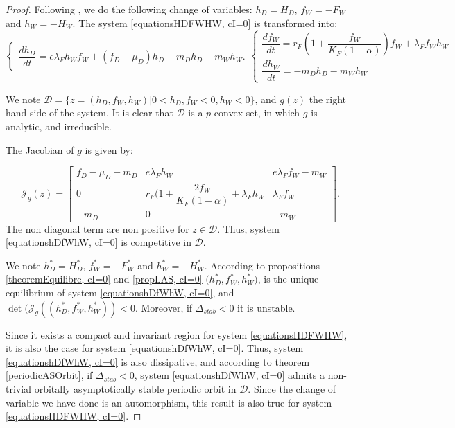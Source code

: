 \documentclass{article}
\newcommand{\lfw}{\lambda_{F}}
\newcommand{\lfw}{\lambda_{F}}
\begin{document}
\begin{proof}
Following \cite{wang_predator-prey_1997}, we do the following change of variables: $h_D =  H_D$, $f_W = -F_W$ and $h_W = -H_W$.  The system \eqref{equationsHDFWHW, cI=0} is transformed into:
\begin{subequations}
\begin{equation}
\left\{ \begin{array}{l}
\dfrac{dh_D}{dt}= e\lfw h_W f_W + (f_D - \mu_D) h_D - m_D h_D - m_W h_W.
\end{array}\right.
\end{equation}
\begin{equation}
\left\lbrace \begin{array}{l}
\dfrac{df_W}{dt} = r_F \left(1 + \dfrac{f_W}{K_F(1-\alpha)} \right) f_W + \lfw f_W h_W \\
\dfrac{dh_W}{dt}= -m_D h_D - m_W h_W 
\end{array} \right.
\end{equation}
\label{equationshDfWhW, cI=0}
\end{subequations}

We note $\mathcal{D} = \Big\{z = (h_D, f_W, h_W) | 0 < h_D, f_W < 0, h_W < 0 \Big\}$, and $g(z)$ the right hand side of the system. It is clear that $\mathcal{D}$ is a $p$-convex set, in which $g$ is analytic, and irreducible.

The Jacobian of $g$ is given by:

\begin{equation*}
\mathcal{J}_g(z) = \begin{bmatrix}
f_D -\mu_D - m_D & e \lfw h_W & e \lfw f_W - m_W \\
0 & r_F \Big(1 + \dfrac{2 f_W}{K_F(1-\alpha)} + \lfw h_W & \lfw f_W \\
-m_D & 0 & -m_W
\end{bmatrix}.
\end{equation*}
The non diagonal term are non positive for $z \in \mathcal{D}$. Thus, system \eqref{equationshDfWhW, cI=0} is competitive in $\mathcal{D}$.

We note $h_D^* = H_D^*$, $f_W^* = -F_W^*$ and $h_W^* = -H_W^*$. According to propositions \ref{theoremEquilibre, cI=0} and \ref{propLAS, cI=0}  $\Big(h_D^*, f_W^*, h_W^* \Big)$, is the unique equilibrium of system \eqref{equationshDfWhW, cI=0}, and $\det(\mathcal{J}_g((h_D^*, f_W^*,h_W^*)) < 0$. Moreover, if $\Delta_{stab} < 0$ it is unstable.

Since it exists a compact and invariant region for system \eqref{equationsHDFWHW}, it is also the case for system \eqref{equationshDfWhW, cI=0}. Thus, system \eqref{equationshDfWhW, cI=0} is also dissipative, and according to theorem \ref{periodicASOrbit}, if $\Delta_{stab} < 0$, system \eqref{equationshDfWhW, cI=0} admits a non-trivial orbitally asymptotically stable  periodic orbit in $\mathcal{D}$. Since the change of variable we have done is an automorphism, this result is also true for system \eqref{equationsHDFWHW, cI=0}.
\end{proof}
\end{document}
